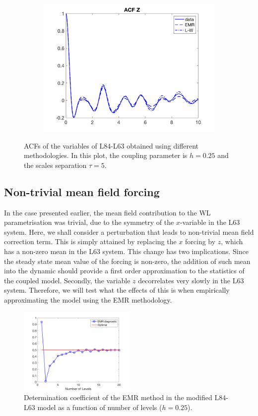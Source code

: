 \documentclass[12pt]{article}
\begin{document}
\begin{figure}[H]
\begin{subfigure}[b]{0.3\textwidth}
		\includegraphics[width=\textwidth]{plots/l84l63/acfzl84025.png}
	\end{subfigure}
	\hfill
	\caption{ACFs of the variables of L84-L63 obtained using different methodologies. In this plot, the coupling parameter is $h=0.25$ and the scales separation $\tau = 5$.}
\end{figure}


\subsection{Non-trivial mean field forcing}

In the case presented earlier, the mean field contribution to the WL parametrisation was trivial, due to the symmetry of the $x$-variable in the L63 system. Here, we shall consider a perturbation that leads to non-trivial mean field correction term. This is simply attained by replacing the $x$ forcing by $z$, which has a non-zero mean in the L63 system. This change has two implications. Since the steady state mean value of the forcing is non-zero, the addition of such mean into the dynamic should provide a first order approximation to the statistics of the coupled model. Secondly, the variable $z$ decorrelates very slowly in the L63 system. Therefore, we will test what the effects of this is when empirically approximating the model using the EMR methodology.

\begin{figure}[H]
	\centering
	\includegraphics[width=0.5\textwidth]{plots/l84l63/emr_diagnostic_025z.png}
	\hfill
	\caption{Determination coefficient of the EMR method in the modified L84-L63 model as a function of number of levels ($h=0.25$).}
\end{figure}
\end{document}
